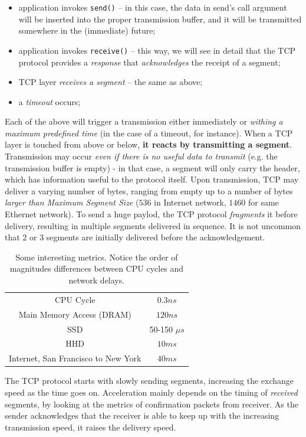 \documentclass[a4paper, 11pt]{report}
\begin{document}
\begin{itemize}
    \item application invokes \texttt{send()} \--- in this case, the data in
        send's call argument will be inserted into the proper transmission
        buffer, and it will be transmitted somewhere in the (immediate) future;
    \item application invokes \texttt{receive()} \--- this way, we will see in
        detail that the TCP protocol provides a \emph{response} that
        \emph{acknowledges} the receipt of a segment;
	\item TCP layer \emph{receives a segment} \--- the same as above;
	\item a \emph{timeout} occurs;
\end{itemize}

Each of the above will trigger a transmission either immediately or
\emph{withing a maximum predefined time} (in the case of a timeout, for
instance). When a TCP layer is touched from above or below, \textbf{it reacts
by transmitting a segment}. Transmission may occur \emph{even if there is no
useful data to transmit} (e.g. the transmission buffer is empty) \-- in that
case, a segment will only carry the header, which has information useful to the
protocol itself. Upon transmission, TCP may deliver a varying number of bytes,
ranging from empty up to a number of bytes \emph{larger than Maximum Segment
Size} ($536$ in Internet network, $1460$ for same Ethernet network). To send a
huge paylod, the TCP protocol \emph{fragments} it before delivery, resulting in
multiple segments delivered in sequence. It is not uncommon that $2$ or $3$
segments are initially delivered before the acknowledgement.

\begin{table}[ht]
\centering
\begin{tabular}{cc}
CPU Cycle & $0.3 ns$ \\
Main Memory Access (DRAM) & $120ns$ \\
SSD & 50-150 $\mu s$ \\
HHD & $10 ms$ \\
Internet, San Francisco to New York & $40ms$
\end{tabular}
\caption{Some interesting metrics. Notice the order of magnitudes differences
between CPU cycles and network delays.}\label{tab:SomeMetrics}
\end{table}
\bigskip

The TCP protocol starts with slowly sending segments, increasing the exchange
speed as the time goes on. Acceleration mainly depends on the timing of
\emph{received} segments, by looking at the metrics of confirmation packets
from receiver. As the sender acknowledges that the receiver is able to keep up
with the increasing transmission speed, it raises the delivery speed.
\end{document}
